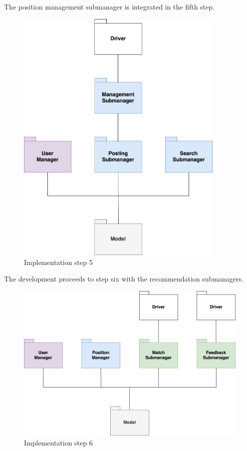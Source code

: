 \newpage
The position management submanager is integrated in the fifth step.

\begin{figure}[h]
    \centering
    \includegraphics[width=10cm]{images/implementation-diagrams/step-5.png}
    \caption{Implementation step 5}
\end{figure}

\newpage
The development proceeds to step six with the recommendation submanagers.

\begin{figure}[h]
    \centering
    \includegraphics[width=13cm]{images/implementation-diagrams/step-6.png}
    \caption{Implementation step 6}
\end{figure}


